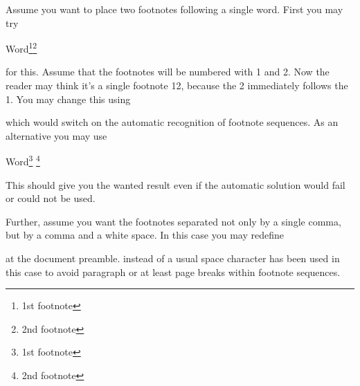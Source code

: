 \ifCommonscrlttr\else
\begin{Example}
  \label{desc:maincls.cmd.footnote.example}%
  Assume you want to place two footnotes following a single word. First you may try
\begin{lstcode}
  Word\footnote{1st footnote}\footnote{2nd footnote}
\end{lstcode}
  for this. Assume that the footnotes will be numbered with 1 and 2. Now the
  reader may think it's a single footnote 12, because the 2
  immediately follows the 1. You may change this using
\begin{lstcode}
\end{lstcode}
  which would switch on the automatic recognition of footnote sequences. As an
  alternative you may use
\begin{lstcode}
  Word\footnote{1st footnote}%
  \multiplefootnoteseparator
  \footnote{2nd footnote}
\end{lstcode}
  This should give you the wanted result even if the automatic solution would
  fail or could not be used.

  Further, assume you want the footnotes separated not only by a single
  comma, but by a comma and a white space. In this case you may redefine
\begin{lstcode}
  \renewcommand*{\multfootsep}{,\nobreakspace}
\end{lstcode}
  at the document preamble. 
  instead of a usual space character has been used in this case to avoid
  paragraph or at least page breaks within footnote sequences.
\end{Example}%
\fi%
%
\EndIndexGroup


